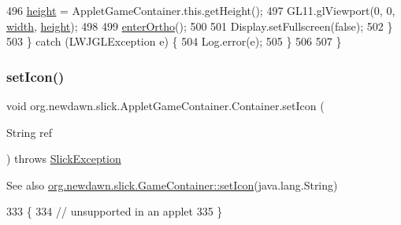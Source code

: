 \begin{DoxyCode}
496                \mbox{\hyperlink{classorg_1_1newdawn_1_1slick_1_1_game_container_aac7312a21bbcaabec14be965c683d970}{height}} = AppletGameContainer.this.getHeight();
497                GL11.glViewport(0, 0, \mbox{\hyperlink{classorg_1_1newdawn_1_1slick_1_1_game_container_a8c65160202b9f5aafde3fcf03e6155c9}{width}}, \mbox{\hyperlink{classorg_1_1newdawn_1_1slick_1_1_game_container_aac7312a21bbcaabec14be965c683d970}{height}});
498 
499                \mbox{\hyperlink{classorg_1_1newdawn_1_1slick_1_1_game_container_a1e8c835b781b018347f50dcf37bbb5c2}{enterOrtho}}();
500 
501                Display.setFullscreen(\textcolor{keyword}{false});
502             \}
503          \} \textcolor{keywordflow}{catch} (LWJGLException e) \{
504             Log.error(e);
505          \}
506 
507       \}
\end{DoxyCode}
\mbox{\label{classorg_1_1newdawn_1_1slick_1_1_applet_game_container_1_1_container_a88a1fdae24dae19ffdcbfafc5307da8b}} 
\subsubsection{\texorpdfstring{set\+Icon()}{setIcon()}}
{\footnotesize\ttfamily void org.\+newdawn.\+slick.\+Applet\+Game\+Container.\+Container.\+set\+Icon (\begin{DoxyParamCaption}\item[{String}]{ref }\end{DoxyParamCaption}) throws \mbox{\hyperlink{classorg_1_1newdawn_1_1slick_1_1_slick_exception}{Slick\+Exception}}\hspace{0.3cm}{\ttfamily [inline]}}

\begin{DoxySeeAlso}{See also}
\mbox{\hyperlink{classorg_1_1newdawn_1_1slick_1_1_game_container_a094c28e0d9f9827b10ddcd68267c65c3}{org.\+newdawn.\+slick.\+Game\+Container\+::set\+Icon}}(java.\+lang.\+String) 
\end{DoxySeeAlso}

\begin{DoxyCode}
333                                                             \{
334          \textcolor{comment}{// unsupported in an applet}
335       \}
\end{DoxyCode}
\mbox{\label{classorg_1_1newdawn_1_1slick_1_1_applet_game_container_1_1_container_a0d4750d4cebf41d78a06c4808e52a3db}} 
